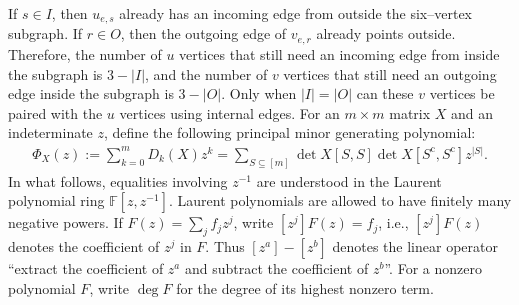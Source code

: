 \documentclass[11pt,a4paper]{article}
\begin{document}
If $s\in I$, then $u_{e,s}$ already has an incoming edge from outside the six–vertex subgraph.
If $r\in O$, then the outgoing edge of $v_{e,r}$ already points outside. Therefore, the number of $u$ vertices that still need an incoming edge from inside the subgraph is $3-|I|$, and the number of $v$ vertices that still need an outgoing edge inside the subgraph is $3-|O|$. Only when $|I|=|O|$ can these $v$ vertices be paired with the $u$ vertices using internal edges.
For an $m\times m$ matrix $X$ and an indeterminate $z$, define the following principal minor generating polynomial:
\begin{eqnarray*}
  \Phi_X(z)
  :=\sum_{k=0}^{m}D_k(X)z^k
  =\sum_{S\subseteq[m]}
    \operatorname{det} X[S,S]\operatorname{det} X[S^{\mathrm{c}},S^{\mathrm{c}}]z^{|S|}.
\end{eqnarray*}
In what follows, equalities involving $z^{-1}$ are understood in the Laurent polynomial ring $\mathbb{F}[z,z^{-1}]$. Laurent polynomials are allowed to have finitely many negative powers. If $F(z)=\sum_jf_jz^j$, write $[z^j]F(z)=f_j$, i.e., $[z^j]F(z)$ denotes the coefficient of $z^j$ in $F$. Thus $[z^a]-[z^b]$ denotes the linear operator ``extract the coefficient of $z^a$ and subtract the coefficient of $z^b$''. For a nonzero polynomial $F$, write $\deg F$ for the degree of its highest nonzero term.
\end{document}
